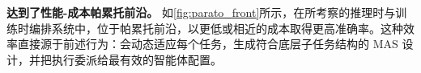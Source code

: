 
\textbf{\ourframework 达到了性能-成本帕累托前沿。}
如\cref{fig:parato_front}所示，在所考察的推理时与训练时编排系统中，\ourframework 位于帕累托前沿，以更低或相近的成本取得更高准确率。这种效率直接源于前述行为：\ourframework 会动态适应每个任务，生成符合底层子任务结构的 MAS 设计，并把执行委派给最有效的智能体配置。









